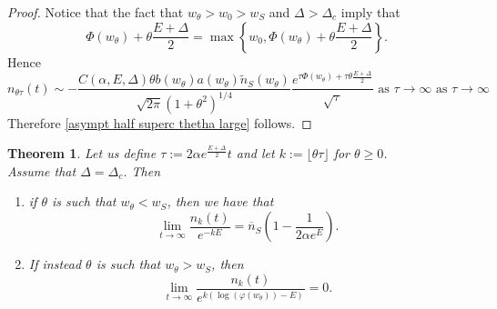 \documentclass{article}
\numberwithin{equation}{section}
\theoremstyle{plain}
\newtheorem{theorem}{Theorem}[section]
\begin{document}
\begin{proof}
Notice that the fact that $ w_\theta > w_0 > w_S  $ and $\Delta > \Delta_c$ imply that
\[ 
\Phi(w_\theta) + \theta \frac{E+ \Delta }{2} =\max\left\{ w_0 , \Phi(w_\theta) + \theta \frac{E+ \Delta }{2} \right\}. 
\]
Hence
\[ 
   n_{\theta \tau } (t)\sim 
        - \frac{ C(\alpha, E, \Delta)  \theta  b(w_\theta)   a(w_\theta ) \tilde{n}_S(w_\theta )}{\sqrt{2 \pi } (1+\theta^2)^{1/4}} \frac{ e^{ \tau \Phi(w_\theta ) + \tau\theta  \frac{E+ \Delta}{2}}}{\sqrt{\tau}} \text{ as } \tau \to \infty
        \text{ as } \tau \to \infty
\]
Therefore 
\eqref{asympt half superc thetha large} follows. 

\end{proof}



\begin{theorem} \label{theo:half line asymptotics delta crit}
Let us define $\tau:= 2 \alpha e^{\frac{E+ \Delta }{2}} t$ and let $k:=\lfloor \theta \tau \rfloor$ for  $\theta \geq 0$.
\\  Assume that $\Delta = \Delta_c $. 
Then 
\begin{enumerate}
\item if $\theta $ is such that $w_\theta < w_S $, then we have that  
     \begin{equation}\label{asympt half crit thetha small}
    \lim_{t \to \infty } \frac{ n_{k} (t) }{ e^{- k E } } =  \overline n_S \left( 1- \frac{1}{2\alpha e^E}\right).
    \end{equation}
 \item    If instead $\theta $ is such that  $w_\theta  >w_S  $, then 
     \begin{equation}\label{asympt half crit thetha large}
    \lim_{t \to \infty } \frac{ n_{k} (t) }{ e^{k( \log(\varphi(w_\theta ))- E ) } } = 0.
    \end{equation}
    \end{enumerate}
\end{theorem}
\end{document}
